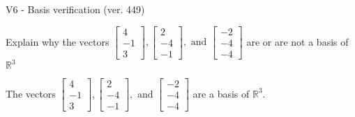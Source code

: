 \begin{exercise}
  \begin{exerciseTitle}V6 - Basis verification (ver. 449)\end{exerciseTitle}
  \begin{exerciseStatement}
    Explain why the vectors \(\left[\begin{array}{r}
4 \\
-1 \\
3
\end{array}\right] , \left[\begin{array}{r}
2 \\
-4 \\
-1
\end{array}\right] , \text{ and } \left[\begin{array}{r}
-2 \\
-4 \\
-4
\end{array}\right]\) are or are not a basis of \(\mathbb{R}^3\)	


  \end{exerciseStatement}
  \begin{exerciseAnswer}
   The vectors \(\left[\begin{array}{r}
4 \\
-1 \\
3
\end{array}\right] , \left[\begin{array}{r}
2 \\
-4 \\
-1
\end{array}\right] , \text{ and } \left[\begin{array}{r}
-2 \\
-4 \\
-4
\end{array}\right]\) 
  	 are  a basis of \(\mathbb{R}^3\).
  


  \end{exerciseAnswer}
\end{exercise}